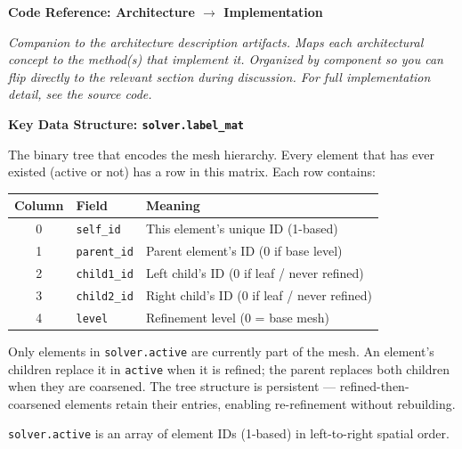 \documentclass[11pt]{article}
\newcommand{\method}[1]{\textcolor{codeblue}{\texttt{#1}}}
\begin{document}
\begin{center}
{\Large\bfseries Code Reference: Architecture $\to$ Implementation}
\end{center}

\vspace{0.15cm}
\noindent\textit{Companion to the architecture description artifacts. Maps each architectural concept to the method(s) that implement it. Organized by component so you can flip directly to the relevant section during discussion. For full implementation detail, see the source code.}

\vspace{0.3cm}

\noindent\textbf{Key Data Structure: \method{solver.label\_mat}}

\vspace{0.15cm}

\noindent The binary tree that encodes the mesh hierarchy. Every element that has ever existed (active or not) has a row in this matrix. Each row contains:

\begin{center}
\renewcommand{\arraystretch}{1.3}
\begin{tabular}{c l l}
\toprule
Column & Field & Meaning \\
\midrule
0 & \texttt{self\_id} & This element's unique ID (1-based) \\
1 & \texttt{parent\_id} & Parent element's ID (0 if base level) \\
2 & \texttt{child1\_id} & Left child's ID (0 if leaf / never refined) \\
3 & \texttt{child2\_id} & Right child's ID (0 if leaf / never refined) \\
4 & \texttt{level} & Refinement level (0 = base mesh) \\
\bottomrule
\end{tabular}
\end{center}

\noindent Only elements in \method{solver.active} are currently part of the mesh. An element's children replace it in \method{active} when it is refined; the parent replaces both children when they are coarsened. The tree structure is persistent --- refined-then-coarsened elements retain their entries, enabling re-refinement without rebuilding.

\vspace{0.1cm}
\noindent \method{solver.active} is an array of element IDs (1-based) in left-to-right spatial order.
\end{document}
